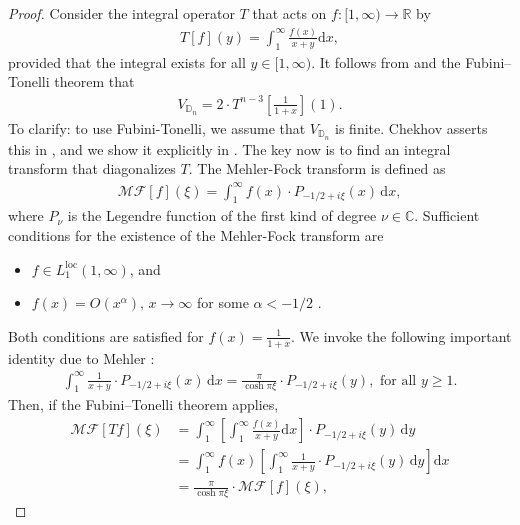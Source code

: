 \documentclass{amsart}
\newcommand{\CC}{\mathbb{C}}
\newcommand{\DD}{\mathbb{D}}
\newcommand{\RR}{\mathbb{R}}
\theoremstyle{definition}
\begin{document}
\begin{proof}
Consider the integral operator $T$ that acts on $f: [1,\infty) \to \RR$ by
\begin{align}
   T[f](y) = \int_1^{\infty} \frac{f(x)}{x+y} \mathrm{d}x,
\end{align}
provided that the integral exists for all $y\in [1,\infty)$. It follows from  and the Fubini–Tonelli theorem that
\begin{align}
\label{eq:vol-n-gon-as-int-transform}
    V_{\mathbb{D}_n}
=2 \cdot T^{n-3}\left[\frac{1}{1+x}\right](1).
\end{align}
To clarify: to use Fubini-Tonelli, we assume that $V_{\DD_n}$ is finite. Chekhov asserts this in \cite{chekhov2024}, and we show it explicitly in .
The key now is to find an integral transform that diagonalizes $T$. The Mehler-Fock transform \cite[Section~1.9]{MR2254107} is defined as 
\begin{align}
    \mathcal{MF}[f](\xi) = \int_1^\infty f(x)\cdot P_{-1/2+i\xi}(x)\,\mathrm{d}x,
\end{align}
where $P_{\nu}$ is the Legendre function of the first kind \cite[Section~7.3]{MR350075} of degree $\nu \in \CC$. Sufficient conditions for the existence of the Mehler-Fock transform are \begin{itemize}
    \item $f\in L^{\text{loc}}_1(1,\infty)$, and 
    \item $f(x) = O(x^{\alpha}),\, x\to \infty$ for some $\alpha<-1/2$ \cite[Theorem~1.9.51]{MR2254107}. 
\end{itemize}
Both conditions are satisfied for $f(x) = \frac{1}{1+x}$. We invoke the following important identity due to Mehler \cite[Page~193]{MR1510098}:
\begin{align}
\label{eq: Mehler formula}
    \int_1^\infty \frac{1}{x+y} \cdot P_{-1/2+i\xi}(x) \,\mathrm{d}x = \frac{\pi}{\cosh \pi \xi}\cdot P_{-1/2+i\xi}(y),
    \text{ for all $y\geqslant1$.}
\end{align}
 Then, if the Fubini–Tonelli theorem applies,
\begin{equation}
\begin{split}
    \mathcal{MF}[Tf](\xi) &=  \int_1^\infty\left[\int_1^{\infty} \frac{f(x)}{x+y} \mathrm{d}x\right] \cdot P_{-1/2+i\xi}(y)\,\mathrm{d}y 
    \\& 
    = \int_1^\infty f(x) \left[\int_1^\infty \frac{1}{x+y}\cdot P_{-1/2+i\xi}(y) \,\mathrm{d}y\right ] \mathrm{d}x
    \\&
    =\frac{\pi}{\cosh \pi\xi}\cdot \mathcal{MF}[f](\xi),

\end{split}
\end{equation}
\end{proof}
\end{document}

